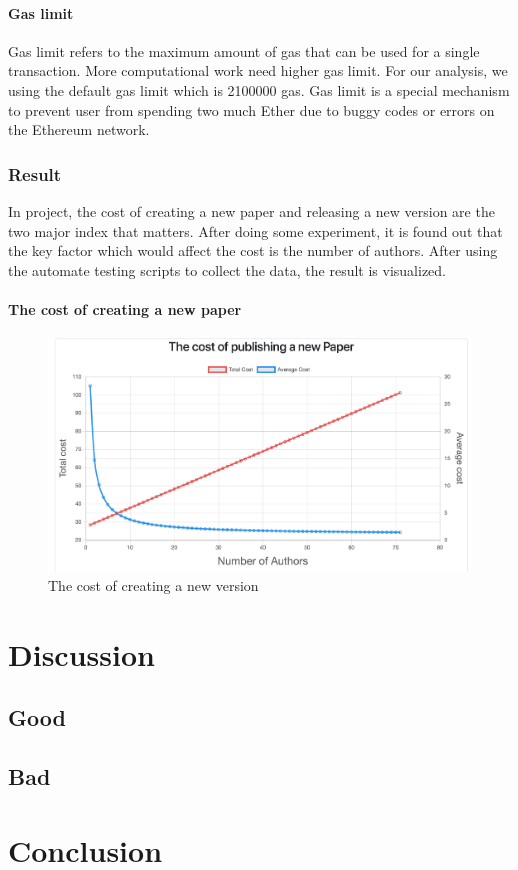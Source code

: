 \documentclass[openany,12pt]{ecsthesis}      %
\begin{document}
\subsubsection{Gas limit}
Gas limit refers to the maximum amount of gas that can be used for a single transaction.
More computational work need higher gas limit. For our analysis, we using the default gas limit which is 2100000 gas.
Gas limit is a special mechanism to prevent user from spending two much Ether due to buggy codes or errors on the Ethereum network. 
\subsection{Result}
In project, the cost of creating a new paper and releasing a new version are the two major index that matters.
After doing some experiment, it is found out that the key factor which would affect the cost is the number of authors.
After using the automate testing scripts to collect the data, the result is visualized.
\subsubsection{The cost of creating a new paper}
\begin{figure}[H]
  \centering
  \includegraphics[width=1\textwidth]{papercost.png}
  \caption{The cost of creating a new version}
  \label{papercost}
\end{figure}
\chapter{Discussion}
\section{Good}
\section{Bad}
\chapter{Conclusion}
\backmatter


\end{document}
